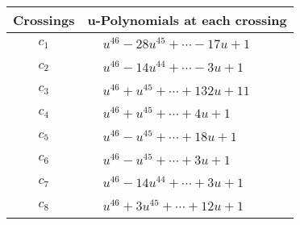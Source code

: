 \documentclass[1p]{elsarticle_modified}
\theoremstyle{definition}
\begin{document}
\begin{tabular}{m{50pt}|m{274pt}}
Crossings & \hspace{64pt}u-Polynomials at each crossing \\
\hline $$\begin{aligned}c_{1}\end{aligned}$$&$\begin{aligned}
&u^{46}-28 u^{45}+\cdots-17 u+1
\end{aligned}$\\
\hline $$\begin{aligned}c_{2}\end{aligned}$$&$\begin{aligned}
&u^{46}-14 u^{44}+\cdots-3 u+1
\end{aligned}$\\
\hline $$\begin{aligned}c_{3}\end{aligned}$$&$\begin{aligned}
&u^{46}+u^{45}+\cdots+132 u+11
\end{aligned}$\\
\hline $$\begin{aligned}c_{4}\end{aligned}$$&$\begin{aligned}
&u^{46}+u^{45}+\cdots+4 u+1
\end{aligned}$\\
\hline $$\begin{aligned}c_{5}\end{aligned}$$&$\begin{aligned}
&u^{46}- u^{45}+\cdots+18 u+1
\end{aligned}$\\
\hline $$\begin{aligned}c_{6}\end{aligned}$$&$\begin{aligned}
&u^{46}- u^{45}+\cdots+3 u+1
\end{aligned}$\\
\hline $$\begin{aligned}c_{7}\end{aligned}$$&$\begin{aligned}
&u^{46}-14 u^{44}+\cdots+3 u+1
\end{aligned}$\\
\hline $$\begin{aligned}c_{8}\end{aligned}$$&$\begin{aligned}
&u^{46}+3 u^{45}+\cdots+12 u+1
\end{aligned}$\\

\end{tabular}
\end{document}
